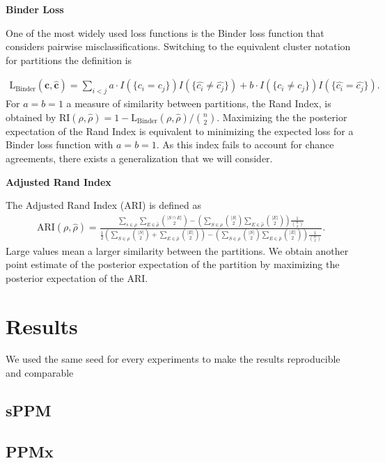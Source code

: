 \documentclass[12pt,a4paper]{article}
\begin{document}
\textbf{Binder Loss}

One of the most widely used loss functions is the Binder loss function that considers pairwise misclassifications. Switching to the equivalent cluster notation for partitions the definition is

\begin{align*}
    \text{L}_{\text{Binder}} (\mathbf{c}, \mathbf{\hat{c}} ) = \sum_{i<j} a \cdot  I (\{ c_i = c_j \}) I (\{ \hat{c_i} \neq \hat{c_j} \} ) +  b \cdot I (\{c_i \neq c_j \}) I (\{ \hat{c_i} = \hat{c_j} \}).
\end{align*}
For $a=b=1$ a measure of similarity between partitions, the Rand Index, is obtained by $\text{RI}(\rho, \hat{\rho}) = 1 -  \text{L}_{\text{Binder}}(\rho, \hat{\rho}) / \binom{n}{2}$. Maximizing the the posterior expectation of the Rand Index is equivalent to minimizing the expected loss for a Binder loss function with $a=b=1$. As this index fails to account for chance agreements, there exists a generalization that we will consider. \medskip

\textbf{Adjusted Rand Index}

The Adjusted Rand Index (ARI) is defined as
\begin{align*}
    \text{ARI} (\rho, \hat{\rho}) = \frac{ \sum_{s \in \rho} \sum_{E \in \hat{\rho}} \binom{| S \cap E |}{2} - \left( \sum_{S \in \rho} \binom{|S|}{2} \sum_{E \in \hat{\rho}} \binom{|E|}{2} \right) \frac{1}{\binom{n}{2}}} {\frac{1}{2} \left( \sum_{S \in \rho} \binom{|S|}{2} + \sum_{E \in \hat{\rho}} \binom{|E|}{2} \right) - \left(\sum_{S \in \rho} \binom{|S|}{2} \sum_{E \in \hat{\rho}} \binom{|E|}{2} \right) \frac{1}{\binom{n}{2}}}.
\end{align*}
Large values mean a larger similarity between the partitions. We obtain another point estimate of the posterior expectation of the partition by maximizing the posterior expectation of the ARI.

\newpage

\section{Results}
We used the same seed for every experiments to make the results
reproducible and comparable
\subsection{sPPM}
\subsection{PPMx}
\end{document}
